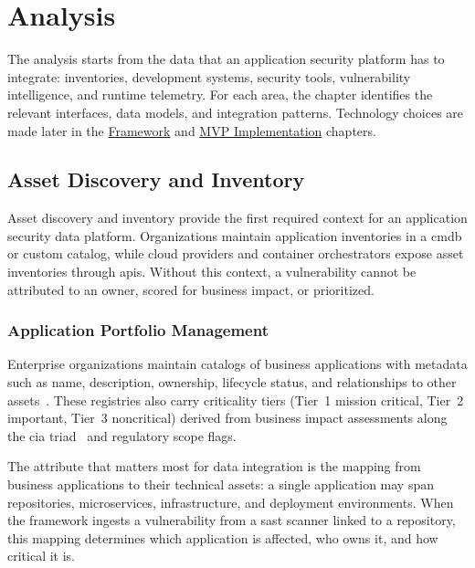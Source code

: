 \chapter{Analysis}
\label{ch:analysis}

The analysis starts from the data that an application security platform has to integrate: inventories, development systems, security tools, vulnerability intelligence, and runtime telemetry. For each area, the chapter identifies the relevant interfaces, data models, and integration patterns. Technology choices are made later in the \hyperref[ch:framework]{Framework} and \hyperref[ch:implementation]{MVP Implementation} chapters.


\section{Asset Discovery and Inventory}
\label{sec:app-inventory}

Asset discovery and inventory provide the first required context for an application security data platform. Organizations maintain application inventories in a \gls{cmdb} or custom catalog, while cloud providers and container orchestrators expose asset inventories through \glspl{api}. Without this context, a vulnerability cannot be attributed to an owner, scored for business impact, or prioritized.


\subsection{Application Portfolio Management}

Enterprise organizations maintain catalogs of business applications with metadata such as name, description, ownership, lifecycle status, and relationships to other assets~\cite{AXELOS2019}. These registries also carry criticality tiers (Tier~1 mission critical, Tier~2 important, Tier~3 noncritical) derived from business impact assessments along the \gls{cia} triad~\cite{Stallings2024, NIST_FIPS199_2004} and regulatory scope flags.

The attribute that matters most for data integration is the mapping from business applications to their technical assets: a single application may span repositories, microservices, infrastructure, and deployment environments. When the framework ingests a vulnerability from a \gls{sast} scanner linked to a repository, this mapping determines which application is affected, who owns it, and how critical it is.

